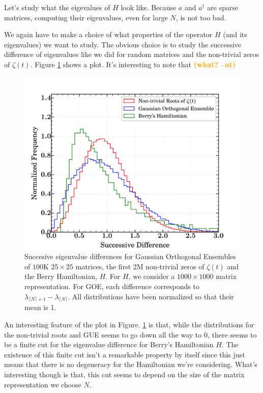 \documentclass{amsproc}
\newcommand{\at}[1]{\textbf{\textcolor{orange}{(#1 --at)}}}
\theoremstyle{definition}
\theoremstyle{remark}
\numberwithin{equation}{section}
\begin{document}
Let's study what the eigevalues of $H$ look like. Because $a$ and $a^{\dagger}$ are sparse matrices, computing their eigenvalues, even for large $N$, is not too bad. 

We again have to make a choice of what properties of the operator $H$ (and its eigenvalues) we want to study. The obvious choice is to study the successive difference of eigenvalues like we did for random matrices and the non-trivial zeros of $\zeta(t)$. Figure \ref{fig:everything} shows a plot. It's interesting to note that \at{what?}


\begin{figure}
\includegraphics[width=\columnwidth]{figures/everything.pdf}
\caption{Succesive eigenvalue differences for Gaussian Orthogonal Ensembles of $100\mathrm{K}$ $25 \times 25$ matrices, the first 2M non-trivial zeros of $\zeta(t)$ and the Berry Hamiltonian, $H$. For $H$, we consider a $1000 \times 1000$ matrix representation. For GOE, each difference corresponds to $\lambda_{\lceil N \rceil + 1} - \lambda_{ \lceil N \rceil}$. All distributions have been normalized so that their mean is 1. }
\label{fig:everything}
\end{figure}

An interesting feature of the plot in Figure. \ref{fig:everything} is that, while the distributions for the non-trivial roots and GUE seems to go down all the way to 0, there seems to be a finite cut for the eigenvalue difference for Berry's Hamiltonian $H$. The existence of this finite cut isn't a remarkable property by itself since this just means that there is no degeneracy for the Hamiltonian we're considering. What's interesting though is that, this cut seems to depend on the size of the matrix representation we choose $N$.
\end{document}
